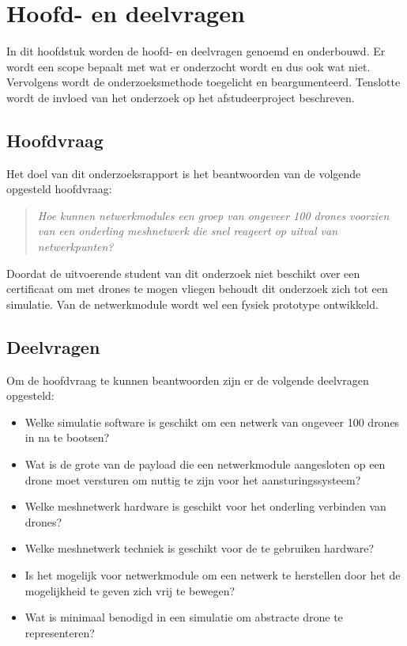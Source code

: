 \documentclass[a4paper, 11pt, oneside]{report}
\begin{document}
\chapter{Hoofd- en deelvragen}
In dit hoofdstuk worden de hoofd- en deelvragen genoemd en onderbouwd.
Er wordt een scope bepaalt met wat er onderzocht wordt en dus ook wat niet.
Vervolgens wordt de onderzoeksmethode toegelicht en beargumenteerd.
Tenslotte wordt de invloed van het onderzoek op het afstudeerproject beschreven.

\section{Hoofdvraag}
Het doel van dit onderzoeksrapport is het beantwoorden van de volgende opgesteld hoofdvraag:
\begin{quotation}
\textit{Hoe kunnen netwerkmodules een groep van ongeveer 100 drones voorzien van een onderling meshnetwerk die snel reageert op uitval van netwerkpunten?}	
\end{quotation}
Doordat de uitvoerende student van dit onderzoek niet beschikt over een certificaat om met drones te mogen vliegen behoudt dit onderzoek zich tot een simulatie.
Van de netwerkmodule wordt wel een fysiek prototype ontwikkeld.

\section{Deelvragen}

Om de hoofdvraag te kunnen beantwoorden zijn er de volgende deelvragen opgesteld:

\begin{itemize}
	\item Welke simulatie software is geschikt om een netwerk van ongeveer 100 drones in na te bootsen?
	\item Wat is de grote van de payload die een netwerkmodule aangesloten op een drone moet versturen om nuttig te zijn voor het aansturingssysteem?
	\item Welke meshnetwerk hardware is geschikt voor het onderling verbinden van drones?
	\item Welke meshnetwerk techniek is geschikt voor de te gebruiken hardware?
	\item Is het mogelijk voor netwerkmodule om een netwerk te herstellen door het de mogelijkheid te geven zich vrij te bewegen?
	\item Wat is minimaal benodigd in een simulatie om abstracte drone te representeren?
\end{itemize}
\end{document}
